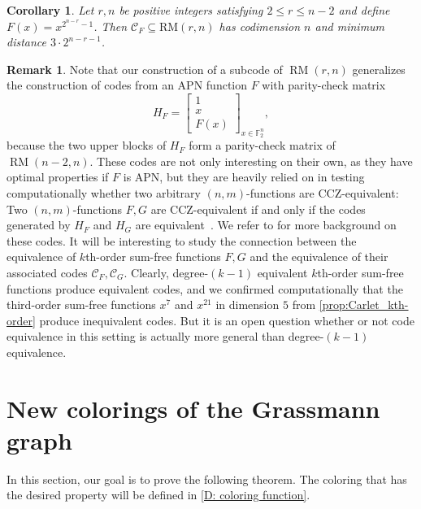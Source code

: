 \documentclass[12pt]{article}
\newtheorem{cor}[thm]{Corollary}
\theoremstyle{definition}
\newtheorem*{remark}{Remark}
\newcommand{\Fpnv}{\mathbb{F}_2^n}
\DeclareMathOperator{\RM}{RM}
\begin{document}
\begin{cor}
\label{cor:construction}
    Let $r, n$ be positive integers satisfying $2 \leq r \leq n-2$ and define $F(x) = x^{2^{n-r}-1}$. Then $\mathcal{C}_F \subseteq \text{RM}(r, n)$ has codimension $n$ and minimum distance $3\cdot 2^{n-r - 1}$.
\end{cor}



\begin{remark}
    Note that our construction of a subcode of $\RM(r,n)$ generalizes the construction of codes from an APN function $F$ with parity-check matrix
    \[
        H_F = \begin{bmatrix}
            1\\
            x\\
            F(x)
        \end{bmatrix}_{x\in\Fpnv},
    \]
    because the two upper blocks of $H_F$ form a parity-check matrix of $\RM(n-2,n)$. These codes are not only interesting on their own, as they have optimal properties if $F$ is APN, but they are heavily relied on in testing computationally whether two arbitrary $(n,m)$-functions are CCZ-equivalent: Two $(n,m)$-functions $F,G$ are CCZ-equivalent if and only if the codes generated by $H_F$ and $H_G$ are equivalent~\cite{edel2009}. We refer to \cite{pott_survey} for more background on these codes. It will be interesting to study the connection between
    the equivalence of $k$th-order sum-free functions $F,G$ 
    and the equivalence of their associated codes $\mathcal{C}_F,\mathcal{C}_G$. Clearly, degree-$(k-1)$ equivalent $k$th-order sum-free functions produce equivalent codes, and we confirmed computationally that the third-order sum-free functions $x^7$ and $x^{21}$ in dimension $5$ from \cref{prop:Carlet_kth-order} produce inequivalent codes. But it is an open question whether or not code equivalence in this setting is actually more general than degree-$(k-1)$ equivalence.
\end{remark}



\section{New colorings of the Grassmann graph}
\label{sec:coloring}

In this section, our goal is to prove the following theorem. The coloring that has the desired property will be defined in \cref{D: coloring function}.
\end{document}
